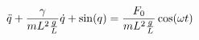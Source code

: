 \documentclass[preview]{standalone}
\begin{document}
\begin{align*}
\special{dvisvgm:raw <g id='unique000'>}\ddot{q} + \frac{\gamma}{m L^2 \frac{g}{L}} \dot{q} +  \sin(q) = \frac{F_0}{m L^2 \frac{g}{L}} \cos(\omega t)\special{dvisvgm:raw </g>}
\end{align*}
\end{document}
